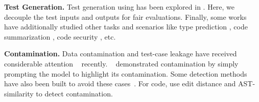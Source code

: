 \noindent \textbf{Test Generation.} 
Test generation using \llms{} has been explored in \citep{yuan2023no, 10329992, tufano2022methods2test, watson2020learning}. 
Here, we decouple the test inputs and outputs for fair evaluations.
Finally, some works have additionally studied other tasks and scenarios like type prediction \citep{mir2022type4py, wei2023typet5, malik2019nl2type}, code summarization \citep{leclair2019neural, iyer2016summarizing, barone2017parallel, hasan2021codesc, alon2018code2seq}, code security \citep{liguori2022can, pearce2022asleep, tony2023llmseceval}, etc. 

%
\noindent \textbf{Contamination.}
Data contamination and test-case leakage have received considerable attention ~\cite{yonatan2024proving,golchin2023time,weller2023according,roberts2024to} recently. %
~\citep{sainz2023chatgpt} demonstrated contamination by simply prompting the model to highlight its contamination. 
Some detection methods have also been built to avoid these cases~\citep{shi2023detecting,zhou2023don}. For code, \citep{riddell2024quantifying} use edit distance and AST-similarity to detect contamination. 
